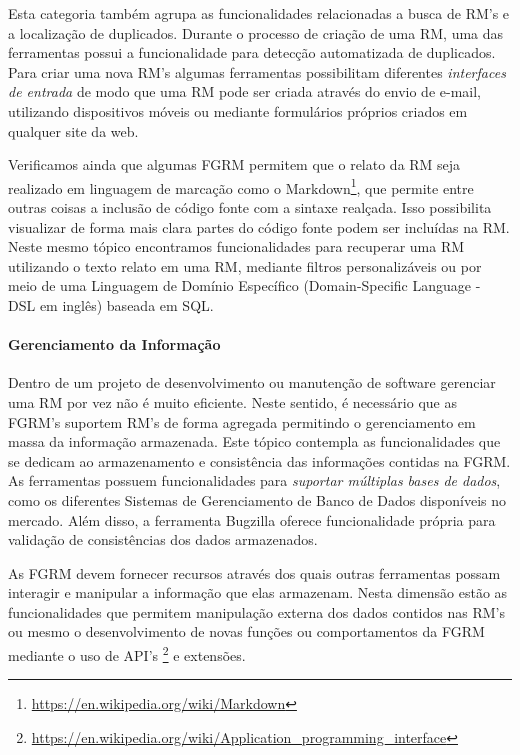 Esta categoria também agrupa as funcionalidades relacionadas a busca de RM's e a
localização de duplicados. Durante o processo de criação de uma RM, uma das
ferramentas possui a funcionalidade  para detecção automatizada de duplicados.
Para criar uma nova RM's algumas ferramentas possibilitam diferentes
\textit{interfaces de entrada} de modo que uma RM pode ser criada através do
envio de e-mail, utilizando dispositivos móveis ou mediante formulários próprios
criados em qualquer site da web.

Verificamos ainda que algumas FGRM permitem que o relato da RM seja realizado em
linguagem de marcação como o
Markdown\footnote{\url{https://en.wikipedia.org/wiki/Markdown}}, que permite
entre outras coisas a inclusão de código fonte com a sintaxe realçada. Isso
possibilita visualizar de forma mais clara partes do código fonte podem ser
incluídas na RM. Neste mesmo tópico encontramos funcionalidades para recuperar
uma RM utilizando o texto relato em uma RM, mediante filtros personalizáveis ou
por meio de uma Linguagem de Domínio Específico (Domain-Specific Language - DSL
em inglês) baseada em SQL.

\paragraph{Gerenciamento da Informação}
\label{par:gerenciamento_da_informação}

Dentro de um projeto de desenvolvimento ou manutenção de software gerenciar uma
RM por vez não é muito eficiente. Neste sentido, é necessário que as FGRM's
suportem RM's de forma agregada permitindo o gerenciamento em massa da
informação armazenada. Este tópico contempla as funcionalidades que se dedicam
ao armazenamento e consistência das informações contidas na FGRM. As ferramentas
possuem funcionalidades para \textit{suportar múltiplas bases de dados}, como os
diferentes Sistemas de Gerenciamento de Banco de Dados disponíveis no mercado.
Além disso, a ferramenta Bugzilla oferece funcionalidade própria para validação
de consistências dos dados armazenados.

As FGRM devem fornecer recursos através dos quais outras ferramentas possam
interagir e manipular a informação que elas armazenam. Nesta dimensão estão as
funcionalidades que permitem manipulação externa dos dados contidos nas RM's ou
mesmo o desenvolvimento de novas funções ou comportamentos da FGRM mediante o
uso de API's
\footnote{\url{https://en.wikipedia.org/wiki/Application_programming_interface}}
e extensões.

